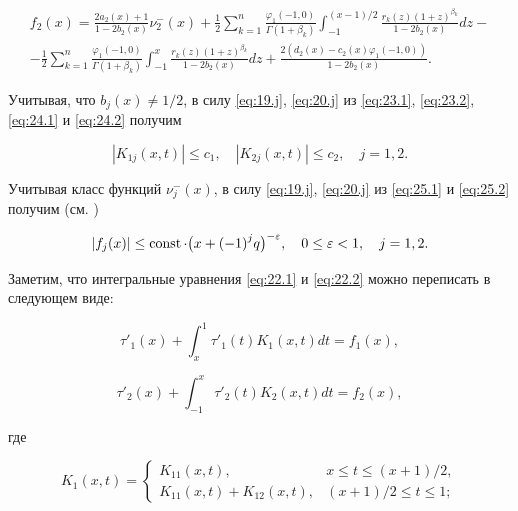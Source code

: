 \begin{multline}

{f_2}(x) = \frac{{2{a_2}(x) + 1}}{{1 - 2{b_2}(x)}}\nu _2^ - (x) + \frac{1}{2}\sum\limits_{k = 1}^n {\frac{{{\varphi _1}( - 1, 0)}}{{\Gamma (1 + {\beta _k})}} \int _{ - 1}^{({{x - 1}})/{2}} {\frac{{{r_k}(z){{(1 + z)}^{{\beta _k}}}}}{{1 - 2{b_2}(x)}}dz} }  - \\

- \frac{1}{2}\sum\limits_{k = 1}^n {\frac{{{\varphi _1}( - 1, 0)}}{{\Gamma (1 + {\beta _k})}} \int _{ - 1}^x {\frac{{{r_k}(z){{(1 + z)}^{{\beta _k}}}}}{{1 - 2{b_2}(x)}}dz} }  + \frac{{2({d_2}(x) - {c_2}(x){\varphi _1}( - 1, 0))}}{{1 - 2{b_2}(x)}}. \label{eq:25.2}

\end{multline}

Учитывая, что ${b_j}(x) \ne {1}/{2}$, в силу \eqref{eq:19.j}, \eqref{eq:20.j}  из \eqref{eq:23.1}, \eqref{eq:23.2}, \eqref{eq:24.1} и \eqref{eq:24.2} получим 

$$\left| {{K_{1j}}(x,t)} \right| \le {c_1},\quad \left| {{K_{2j}}(x,t)} \right| \le {c_2},\quad  j = 1, 2.$$  

Учитывая класс функций $\nu _j^ - (x)$, в силу \eqref{eq:19.j}, \eqref{eq:20.j} из \eqref{eq:25.1} и \eqref{eq:25.2} получим (см. \cite{Islabd:bib:Islomabdul}) 

\begin{equation}

\left| {{f_j}(x)} \right| \le \mathop{\rm const} \cdot \bigl( {x + {( - 1)}^j q} \bigr)^{ - \varepsilon }, \quad 0 \le \varepsilon  < 1, \quad j = 1, 2. \label{eq:26.j}

\end{equation}

Заметим, что интегральные уравнения \eqref{eq:22.1} и \eqref{eq:22.2} можно переписать в следующем виде:

$$

{\tau '_1}(x) +  \int _x^1 {{\tau '_1}(t){K_1}(x,t)dt}  = f_1(x),$$ 

$${\tau '_2}(x) +  \int _{ - 1}^x {{\tau '_2}(t){K_2}(x,t)dt}  = f_2(x),$$

где  

$$

{K_1}(x,t) = 

\left\{\begin{array}{cl}

{K_{11}}(x,t), & x \le t \le ({{x + 1}})/{2},\\

{K_{11}}(x,t) + {K_{12}}(x,t), & ({{x + 1}})/{2} \le t \le 1;

\end{array}\right. $$

